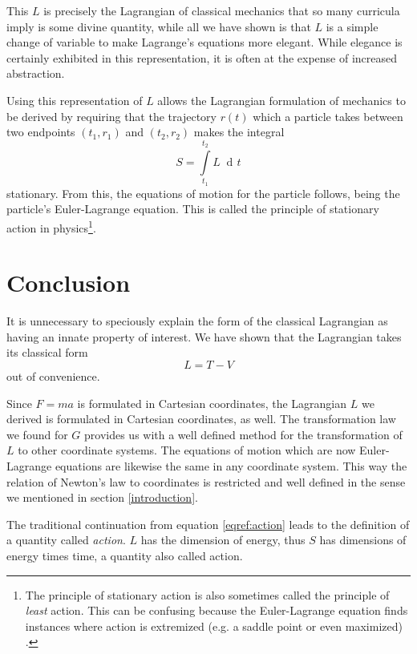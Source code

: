 \documentclass[prb,preprint]{revtex4-1}
\DeclareMathOperator{\dd}{d\!}
\begin{document}
This $L$ is precisely the Lagrangian of classical mechanics that so many curricula imply is some divine quantity, while all we have shown is that $L$ is a simple change of variable to make Lagrange's equations more elegant. While elegance is certainly exhibited in this representation, it is often at the expense of increased abstraction.

Using this representation of $L$ allows the Lagrangian formulation of mechanics to be derived by requiring that the trajectory $r(t)$ which a particle takes between two endpoints $(t_1,r_1)$ and $(t_2,r_2)$ makes the integral
\begin{equation}\label{eqref:action}
S=\int\limits_{t_1}^{t_2} L \; \dd t
\end{equation}
stationary. From this, the equations of motion for the particle follows, being the particle's Euler-Lagrange equation. This is called the principle of stationary action in physics\footnote{The principle of stationary action is also sometimes called the principle of \emph{least} action. This can be confusing because the Euler-Lagrange equation finds instances where action is extremized (e.g. a saddle point or even maximized) \cite{action-not-least}.}. 

\section{Conclusion}

It is unnecessary to speciously explain the form of the classical Lagrangian as having an innate property of interest. We have shown that the Lagrangian takes its classical form
\begin{equation}
    L = T-V
\end{equation}
out of convenience.

Since $F=ma$ is formulated in Cartesian coordinates, the Lagrangian $L$ we derived is formulated in Cartesian coordinates, as well. The transformation law we found for $G$ provides us with a well defined method for the transformation of $L$ to other coordinate systems. The equations of motion which are now Euler-Lagrange equations are likewise the same in any coordinate system.  This way the relation of Newton's law to coordinates is restricted and well defined in the sense we mentioned in section \ref{introduction}.

The traditional continuation from equation \eqref{eqref:action} leads to the definition of a quantity called \emph{action}. $L$ has the dimension of energy, thus $S$ has dimensions of energy times time, a quantity also called action.
\end{document}
